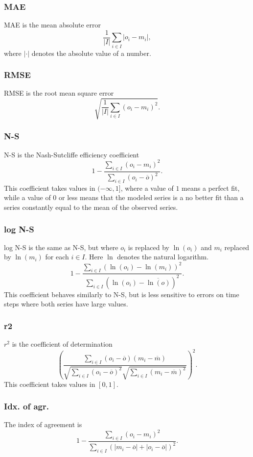 \documentclass[11pt]{article}
\theoremstyle{definition}
\begin{document}
\subsubsection{MAE}
MAE is the mean absolute error
\[
\frac{1}{|I|}\sum_{i\in I}|o_i - m_i|,
\]
where $|\cdot|$ denotes the absolute value of a number.

\subsubsection{RMSE}
RMSE is the root mean square error
\[
\sqrt{\frac{1}{|I|}\sum_{i\in I}(o_i-m_i)^2}.
\]

\subsubsection{N-S}
N-S is the Nash-Sutcliffe efficiency coefficient \cite{nashsutcliffe70}
\[
1 - \frac{\sum_{i\in I}(o_i - m_i)^2}{\sum_{i\in I}(o_i-\overline{o})^2}.
\]
This coefficient takes values in $(-\infty, 1]$, where a value of $1$ means a perfect fit, while a value of $0$ or less means that the modeled series is a no better fit than a series constantly equal to the mean of the observed series.

\subsubsection{log N-S}
log N-S is the same as N-S, but where $o_i$ is replaced by $\ln(o_i)$ and $m_i$ replaced by $\ln(m_i)$ for each $i\in I$. Here $\ln$ denotes the natural logarithm.
\[
1 - \frac{\sum_{i\in I}(\ln(o_i) - \ln(m_i))^2}{\sum_{i\in I}(\ln(o_i)-\overline{\ln(o)})^2}.
\]
This coefficient behaves similarly to N-S, but is less sensitive to errors on time steps where both series have large values.

\subsubsection{r2}
$r^2$ is the coefficient of determination
\[
\left(\frac{\sum_{i\in I}(o_i-\overline{o})(m_i-\overline{m})}{\sqrt{\sum_{i\in I}(o_i-\overline{o})^2}\sqrt{\sum_{i\in I}(m_i-\overline{m})^2}}\right)^2.
\]
This coefficient takes values in $[0, 1]$.

\subsubsection{Idx. of agr.}
The index of agreement is
\[
1 - \frac{\sum_{i\in I}(o_i-m_i)^2}{\sum_{i\in I}(|m_i-\overline{o}| + |o_i-\overline{o}|)^2}.
\]
\end{document}
